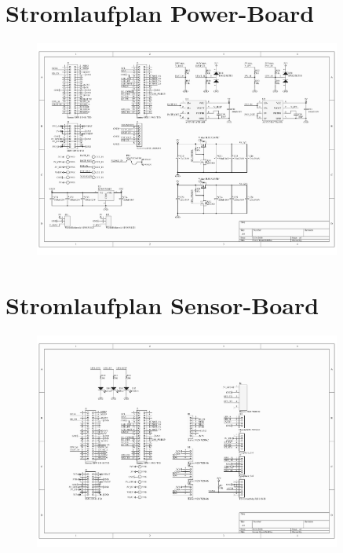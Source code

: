 \section{Stromlaufplan Power-Board}

\begin{figure}[H]
  \centering
  \includegraphics[angle=90, width=0.9\textwidth]{./img/PCB_Power_SCH.pdf}

\end{figure}

\section{Stromlaufplan Sensor-Board}

\begin{figure}[H]
  \centering
  \includegraphics[angle=90, width=0.9\textwidth]{./img/PCB_Sensors_SCH.pdf}

\end{figure}